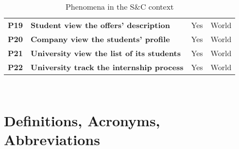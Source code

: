 \begin{table}[H]
\begin{tabular}{|c|p{20em}|c|c|}
    \textbf{P19} & \textbf{Student view the offers' description} & Yes & World \T\B \\
    \textbf{P20} & \textbf{Company view the students' profile} & Yes & World \T\B\\
    \textbf{P21} & \textbf{University view the list of its students} & Yes & World \B\\
    \textbf{P22} & \textbf{University track the internship process} & Yes & World \T\B\\
    \hline
    \end{tabular}
    \\[10pt]
    \caption{Phenomena in the S\&C context}\label{table:phenomena}
\end{table}

\section{Definitions, Acronyms, Abbreviations}\label{sec:definitions}
